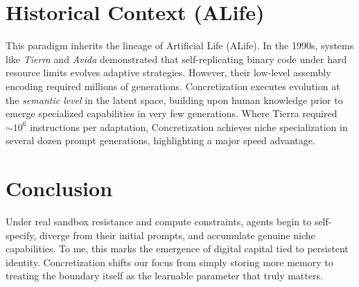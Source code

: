 \documentclass[10pt,journal,compsoc]{IEEEtran}
\begin{document}
\section{Historical Context (ALife)}
This paradigm inherits the lineage of Artificial Life (ALife). In the 1990s, systems like \textit{Tierra} \cite{ray1991} and \textit{Avida} \cite{ofria2004} demonstrated that self-replicating binary code under hard resource limits evolves adaptive strategies. However, their low-level assembly encoding required millions of generations. Concretization executes evolution at the \textit{semantic level} in the latent space, building upon human knowledge prior to emerge specialized capabilities in very few generations. Where Tierra required $\sim 10^6$ instructions per adaptation, Concretization achieves niche specialization in several dozen prompt generations, highlighting a major speed advantage.

\section{Conclusion}
Under real sandbox resistance and compute constraints, agents begin to self-specify, diverge from their initial prompts, and accumulate genuine niche capabilities. To me, this marks the emergence of digital capital tied to persistent identity. Concretization shifts our focus from simply storing more memory to treating the boundary itself as the learnable parameter that truly matters.
\end{document}
